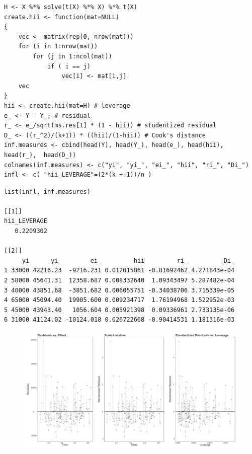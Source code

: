 \documentclass[10pt, twoside, openleft]{article}
\begin{document}
\begin{verbatim}
H <- X %*% solve(t(X) %*% X) %*% t(X)
create.hii <- function(mat=NULL)
{
	vec <- matrix(rep(0, nrow(mat)))
	for (i in 1:nrow(mat))
		for (j in 1:ncol(mat))
			if ( i == j)
				vec[i] <- mat[i,j] 
	vec
}
hii <- create.hii(mat=H) # leverage
e_ <- Y - Y_; # residual
r_ <- e_/sqrt(ms.res[1] * (1 - hii)) # studentized residual
D_ <- ((r_^2)/(k+1)) * ((hii)/(1-hii)) # Cook's distance
inf.measures <- cbind(head(Y), head(Y_), head(e_), head(hii), head(r_),  head(D_))
colnames(inf.measures) <- c("yi", "yi_", "ei_", "hii", "ri_", "Di_")
infl <- c( "hii_LEVERAGE"=(2*(k + 1))/n )
\end{verbatim}

\begin{verbatim}
list(infl, inf.measures)

[[1]]
hii_LEVERAGE
   0.2209302

[[2]]
     yi      yi_        ei_         hii         ri_          Di_
1 33000 42216.23  -9216.231 0.012015861 -0.81692462 4.271843e-04
2 58000 45641.31  12358.687 0.008332640  1.09343497 5.287482e-04
3 40000 43851.68  -3851.682 0.006055751 -0.34038706 3.715339e-05
4 65000 45094.40  19905.600 0.009234717  1.76194968 1.522952e-03
5 45000 43943.40   1056.604 0.005921398  0.09336961 2.733135e-06
6 31000 41124.02 -10124.018 0.026722668 -0.90414531 1.181316e-03
\end{verbatim}

\begin{figure}[H]
\centering
\includegraphics[scale=0.365]{plot3}
\caption{}
\end{figure}
\end{document}
